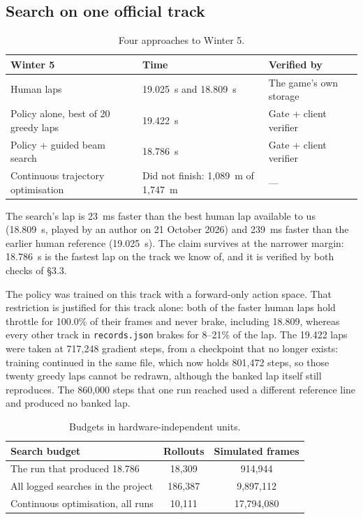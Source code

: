 \documentclass[11pt]{article}
\begin{document}
\subsection{Search on one official track}

\begin{table}[h]
\centering
\small
\begin{tabular}{@{}L{6cm}L{3.5cm}L{3cm}@{}}
\toprule
\textbf{Winter 5} & \textbf{Time} & \textbf{Verified by} \\
\midrule
Human laps & 19.025~s and 18.809~s & The game's own storage \\
Policy alone, best of 20 greedy laps & 19.422~s & Gate + client verifier \\
Policy + guided beam search & 18.786~s & Gate + client verifier \\
Continuous trajectory optimisation & Did not finish: 1,089~m of 1,747~m & --- \\
\bottomrule
\end{tabular}
\caption{Four approaches to Winter 5.}
\label{tab:winter5}
\end{table}

The search's lap is 23~ms faster than the best human lap available to us (18.809~s, played by an author on 21 October 2026) and 239~ms faster than the earlier human reference (19.025~s). The claim survives at the narrower margin: 18.786~s is the fastest lap on the track we know of, and it is verified by both checks of \S3.3.

The policy was trained on this track with a forward-only action space. That restriction is justified for this track alone: both of the faster human laps hold throttle for 100.0\% of their frames and never brake, including 18.809, whereas every other track in \texttt{records.json} brakes for 8--21\% of the lap. The 19.422 laps were taken at 717,248 gradient steps, from a checkpoint that no longer exists: training continued in the same file, which now holds 801,472 steps, so those twenty greedy laps cannot be redrawn, although the banked lap itself still reproduces. The 860,000 steps that one run reached used a different reference line and produced no banked lap.

\begin{table}[h]
\centering
\begin{tabular}{@{}lcc@{}}
\toprule
\textbf{Search budget} & \textbf{Rollouts} & \textbf{Simulated frames} \\
\midrule
The run that produced 18.786 & 18,309 & 914,944 \\
All logged searches in the project & 186,387 & 9,897,112 \\
Continuous optimisation, all runs & 10,111 & 17,794,080 \\
\bottomrule
\end{tabular}
\caption{Budgets in hardware-independent units.}
\label{tab:budgets}
\end{table}
\end{document}
